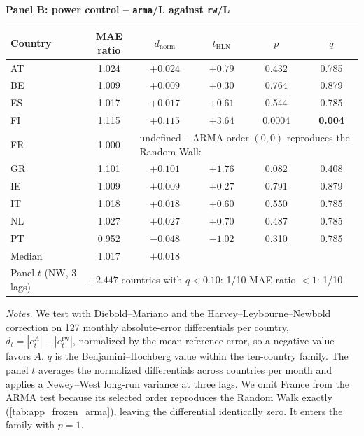 \begin{table}[t]
\vspace{3mm}
\textbf{Panel B: power control -- \texttt{arma}/L against \texttt{rw}/L}\\[1mm]
\begin{tabular}{lccccc}
\toprule
Country & MAE ratio & $d_{\mathrm{norm}}$ & $t_{\mathrm{HLN}}$ & $p$ & $q$ \\
\midrule
AT & 1.024 & $+0.024$ & $+0.79$ & 0.432 & 0.785 \\
BE & 1.009 & $+0.009$ & $+0.30$ & 0.764 & 0.879 \\
ES & 1.017 & $+0.017$ & $+0.61$ & 0.544 & 0.785 \\
FI & 1.115 & $+0.115$ & $+3.64$ & 0.0004 & \textbf{0.004} \\
FR & 1.000 & \multicolumn{4}{l}{undefined -- ARMA order $(0,0)$ reproduces the Random Walk} \\
GR & 1.101 & $+0.101$ & $+1.76$ & 0.082 & 0.408 \\
IE & 1.009 & $+0.009$ & $+0.27$ & 0.791 & 0.879 \\
IT & 1.018 & $+0.018$ & $+0.60$ & 0.550 & 0.785 \\
NL & 1.027 & $+0.027$ & $+0.70$ & 0.487 & 0.785 \\
PT & 0.952 & $-0.048$ & $-1.02$ & 0.310 & 0.785 \\
\midrule
Median & 1.017 & $+0.018$ & & & \\
Panel $t$ (NW, 3 lags) & \multicolumn{5}{l}{$+2.447$ \quad countries with $q<0.10$: 1/10 \quad MAE ratio $<1$: 1/10} \\
\bottomrule
\end{tabular}

\vspace{4pt}
{\footnotesize
\begin{minipage}{0.98\textwidth}
\textit{Notes.} We test with Diebold--Mariano and the Harvey--Leybourne--Newbold correction on 127 monthly absolute-error differentials per country, $d_t=|e^A_t|-|e^{\mathrm{rw}}_t|$, normalized by the mean reference error, so a negative value favors $A$. $q$ is the Benjamini--Hochberg value within the ten-country family. The panel $t$ averages the normalized differentials across countries per month and applies a Newey--West long-run variance at three lags. We omit France from the ARMA test because its selected order reproduces the Random Walk exactly (\cref{tab:app_frozen_arma}), leaving the differential identically zero. It enters the family with $p=1$.
\end{minipage}}
\end{table}


